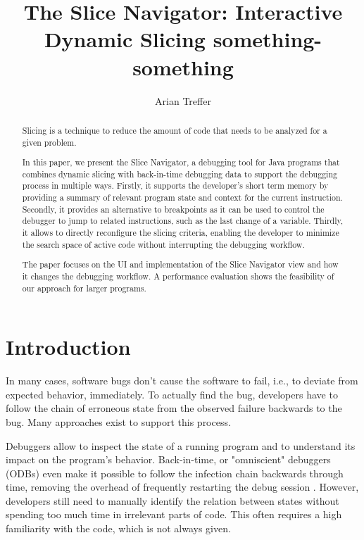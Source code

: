 ﻿\documentclass[
      english,
			conference,
      ]{IEEEtran}
\title{The Slice Navigator: Interactive Dynamic Slicing something-something}
\author{Arian Treffer}
\begin{document}
\maketitle

\begin{abstract}
Slicing is a technique to reduce the amount of code that needs to be analyzed for a given problem.

In this paper, we present the Slice Navigator, a debugging tool for Java programs that combines dynamic slicing with back-in-time debugging data to support the debugging process in multiple ways.
Firstly, it supports the developer's short term memory by providing a summary of relevant program state and context for the current instruction.
Secondly, it provides an alternative to breakpoints as it can be used to control the debugger to jump to related instructions, such as the last change of a variable.
Thirdly, it allows to directly reconfigure the slicing criteria, enabling the developer to minimize the search space of active code without interrupting the debugging workflow.

The paper focuses on the UI and implementation of the Slice Navigator view and how it changes the debugging workflow.
A performance evaluation shows the feasibility of our approach for larger programs.

\end{abstract}

\section{Introduction}
\label{sec:introduction}

In many cases, software bugs don't cause the software to fail, i.e., to deviate from expected behavior, immediately.
To actually find the bug, developers have to follow the chain of erroneous state from the observed failure backwards to the bug.
Many approaches exist to support this process.

Debuggers allow to inspect the state of a running program and to understand its impact on the program's behavior.
Back-in-time, or "omniscient" debuggers (ODBs) even make it possible to follow the infection chain backwards through time, removing the overhead of frequently restarting the debug session \cite{lewis_debugging_2003}.
However, developers still need to manually identify the relation between states without spending too much time in irrelevant parts of code.
This often requires a high familiarity with the code, which is not always given.
%
\end{document}
